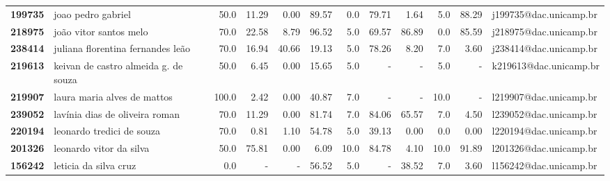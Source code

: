 \documentclass[11pt]{article}
\begin{document}
\begin{center}
\begin{landscape}
\begin{longtable}{llrrrrrrrrrl}
\textbf{199735} &                    joao pedro gabriel &                  50.0 &       11.29 &        0.00 &       89.57 &                      0.0 &       79.71 &        1.64 &                        5.0 &       88.29 &  j199735@dac.unicamp.br \\
\textbf{218975} &                joão vitor santos melo &                  70.0 &       22.58 &        8.79 &       96.52 &                      5.0 &       69.57 &       86.89 &                        0.0 &       85.59 &  j218975@dac.unicamp.br \\
\textbf{238414} &     juliana florentina fernandes leão &                  70.0 &       16.94 &       40.66 &       19.13 &                      5.0 &       78.26 &        8.20 &                        7.0 &        3.60 &  j238414@dac.unicamp.br \\
\textbf{219613} &  keivan de castro almeida g. de souza &                  50.0 &        6.45 &        0.00 &       15.65 &                      5.0 &           - &           - &                        5.0 &           - &  k219613@dac.unicamp.br \\
\textbf{219907} &           laura maria alves de mattos &                 100.0 &        2.42 &        0.00 &       40.87 &                      7.0 &           - &           - &                       10.0 &           - &  l219907@dac.unicamp.br \\
\textbf{239052} &        lavínia dias de oliveira roman &                  70.0 &       11.29 &        0.00 &       81.74 &                      7.0 &       84.06 &       65.57 &                        7.0 &        4.50 &  l239052@dac.unicamp.br \\
\textbf{220194} &             leonardo tredici de souza &                  70.0 &        0.81 &        1.10 &       54.78 &                      5.0 &       39.13 &        0.00 &                        0.0 &        0.00 &  l220194@dac.unicamp.br \\
\textbf{201326} &               leonardo vitor da silva &                  50.0 &       75.81 &        0.00 &        6.09 &                     10.0 &       84.78 &        4.10 &                       10.0 &       91.89 &  l201326@dac.unicamp.br \\
\textbf{156242} &                 leticia da silva cruz &                   0.0 &           - &           - &       56.52 &                      5.0 &           - &       38.52 &                        7.0 &        3.60 &  l156242@dac.unicamp.br \\

\end{longtable}
\end{landscape}
\end{center}
\end{document}
